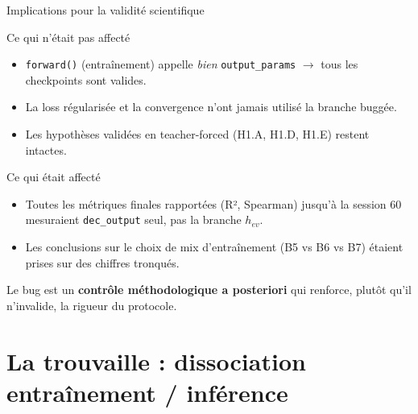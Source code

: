 \documentclass[10pt]{beamer}
\begin{document}
\begin{frame}{Implications pour la validité scientifique}
\vspace{-0.15cm}
  \begin{block}{Ce qui n'était pas affecté}
    \begin{itemize}
      \item \texttt{forward()} (entraînement) appelle \emph{bien} \texttt{output\_params} $\to$ tous les checkpoints sont valides.
      \item La loss régularisée et la convergence n'ont jamais utilisé la branche buggée.
      \item Les hypothèses validées en teacher-forced (H1.A, H1.D, H1.E) restent intactes.
    \end{itemize}
  \end{block}
  \vspace{-0.15cm}

  \begin{block}{Ce qui était affecté}
    \begin{itemize}
      \item Toutes les métriques finales rapportées (R², Spearman) jusqu'à la session 60 mesuraient \texttt{dec\_output} seul, pas la branche $h_{ev}$.
      \item Les conclusions sur le choix de mix d'entraînement (B5 vs B6 vs B7) étaient prises sur des chiffres tronqués.
    \end{itemize}
  \end{block}
  \vspace{-0.15cm}

  \begin{verdictbox}
    Le bug est un \textbf{contrôle méthodologique a posteriori} qui renforce, plutôt qu'il n'invalide, la rigueur du protocole.
  \end{verdictbox}
\end{frame}


\section{La trouvaille : dissociation entraînement / inférence}
\end{document}
